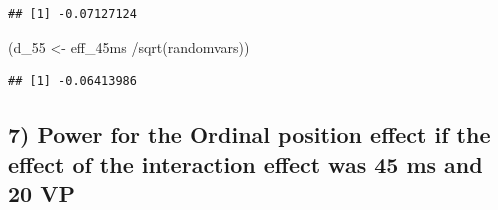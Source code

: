 \documentclass[
]{article}
\newenvironment{Shaded}{\begin{snugshade}}{\end{snugshade}}
\newcommand{\DecValTok}[1]{\textcolor[rgb]{0.00,0.00,0.81}{#1}}
\newcommand{\FunctionTok}[1]{\textcolor[rgb]{0.00,0.00,0.00}{#1}}
\newcommand{\NormalTok}[1]{#1}
\newcommand{\OtherTok}[1]{\textcolor[rgb]{0.56,0.35,0.01}{#1}}
\newcommand{\SpecialCharTok}[1]{\textcolor[rgb]{0.00,0.00,0.00}{#1}}
\newcommand{\StringTok}[1]{\textcolor[rgb]{0.31,0.60,0.02}{#1}}
\begin{document}
\begin{verbatim}
## [1] -0.07127124
\end{verbatim}

\begin{Shaded}
\begin{Highlighting}[]
\NormalTok{(d\_55 }\OtherTok{\textless{}{-}}\NormalTok{ eff\_45ms }\SpecialCharTok{/}\FunctionTok{sqrt}\NormalTok{(randomvars))}
\end{Highlighting}
\end{Shaded}

\begin{verbatim}
## [1] -0.06413986
\end{verbatim}

\hypertarget{power-for-the-ordinal-position-effect-if-the-effect-of-the-interaction-effect-was-45-ms-and-20-vp}{%
\subsection{7) Power for the Ordinal position effect if the effect of
the interaction effect was 45 ms and 20
VP}\label{power-for-the-ordinal-position-effect-if-the-effect-of-the-interaction-effect-was-45-ms-and-20-vp}}

\begin{Shaded}
\end{Shaded}
\end{document}
